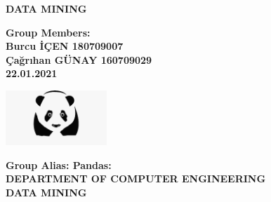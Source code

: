 \begin{titlepage}
	\begin{center}
	\fontsize{20pt}{20pt} \selectfont \textbf{\topic}
	\vspace*{1.4cm}
	
	\fontsize{13pt}{13pt} \selectfont {A Project report for Data Mining Final Project }
	
	
	\vspace*{0.8cm}
	
	
	\fontsize{14pt}{1cm}\selectfont\textbf{{DATA MINING}}
	
	\vspace*{0.8cm}

	
	\vspace*{0.8cm}
	\textbf{Group Members:}\\
	\textbf{Burcu İÇEN 180709007}\\
	\textbf{Çağrıhan GÜNAY 160709029}\\

	\textbf{22.01.2021}
	
	\vspace*{1.5cm}
	\includegraphics[width=1.5in]{Pandas.jpeg}
	\vspace*{0.2cm}

	\textbf{Group Alias: Pandas:}\\

	
	\vspace*{1.5cm}
	\fontsize{12pt}{1cm}\selectfont \textbf{DEPARTMENT OF COMPUTER ENGINEERING}\\
	\vspace*{0.5cm}
	\fontsize{12pt}{12pt}\selectfont \textbf{DATA MINING}\\
	\vspace*{0.5cm}
	
\end{center}
\end{titlepage}
